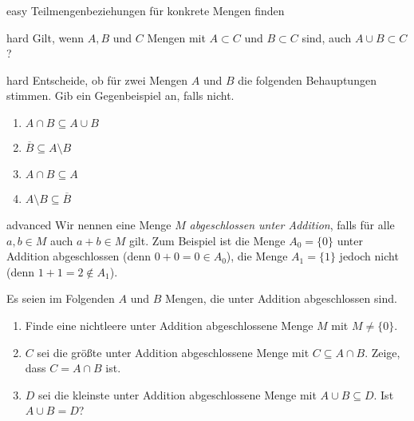 \documentclass[../abbildungen.tex]{subfiles}
\begin{document}
\begin{exercise}{easy}
    Teilmengenbeziehungen für konkrete Mengen finden
\end{exercise}

\begin{exercise}{hard}
    Gilt, wenn $A,B$ und $C$ Mengen mit $A\subset C$ und $B\subset C$ sind, auch $A\cup B\subset C$?
\end{exercise}

\begin{exercise}{hard}
    Entscheide, ob für zwei Mengen $A$ und $B$ die folgenden Behauptungen stimmen. Gib ein Gegenbeispiel an, falls nicht.
    \begin{multicols}{4}
        \begin{enumerate}
            \item $A\cap B\subseteq A\cup B$
            \item $\overline{B}\subseteq A\setminus B$
            \item $A\cap B\subseteq A$
            \item $A\setminus B\subseteq \overline{B}$
        \end{enumerate}
    \end{multicols}
\end{exercise}

\begin{exercise}{advanced}
    Wir nennen eine Menge $M$ \emph{abgeschlossen unter Addition}, falls für alle $a,b\in M$ auch $a+b\in M$ gilt. Zum Beispiel ist die Menge $A_0=\{0\}$ unter Addition abgeschlossen (denn $0+0=0\in A_0$), die Menge $A_1=\{1\}$ jedoch nicht (denn $1+1=2\notin A_1$).
    
    Es seien im Folgenden $A$ und $B$ Mengen, die unter Addition abgeschlossen sind.

    \begin{enumerate}
        \item Finde eine nichtleere unter Addition abgeschlossene Menge $M$ mit $M\neq \{0\}$.
        \item $C$ sei die größte unter Addition abgeschlossene Menge mit $C\subseteq A\cap B$. Zeige, dass $C=A\cap B$ ist.
        \item $D$ sei die kleinste unter Addition abgeschlossene Menge mit $A\cup B\subseteq D$. Ist $A\cup B=D$?
    \end{enumerate}
\end{exercise}
\end{document}
